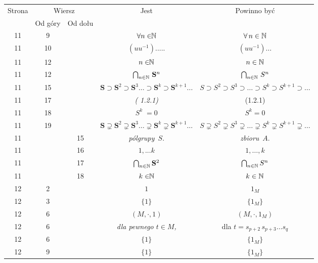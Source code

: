 \documentclass[a4paper,11pt]{article}
\begin{document}
\begin{center}
  \begin{tabular}{|c|c|c|c|c|}
    \hline
    Strona & \multicolumn{2}{c|}{Wiersz} & Jest
                              & Powinno być \\ \cline{2-3}
    & Od góry & Od dołu & & \\
    \hline
    11 &  9 & & $\forall n \in \!\! \mathbb{N}$ & $\forall \, n \in \mathbb{N}$ \\
    11 & 10 & & $( u u^{ -1 } ).....$ & $( u u^{ - 1 } ) \ldots$ \\
    11 & 12 & & $n \in \!\! \mathbb{N}$ & $n \in \mathbb{N}$ \\
    11 & 12 & & $\bigcap_{ n \in \mathbb{N} } \, \mathbf{S}^{ n }$
    & $\bigcap_{ n \in \mathbb{N} } \, S^{ n }$ \\
    11 & 15 & & $\mathbf{S} \supset \mathbf{S}^{ 2 } \supset \mathbf{S}^{ 3 } \ldots
                \supset \mathbf{S}^{ k } \supset \mathbf{S}^{ k + 1 } ...$
    & $S \supset S^{ 2 } \supset S^{ 3 } \supset \ldots \supset S^{ k } \supset S^{ k + 1 } \supset \ldots$ \\
    11 & 17 & & \textit{( 1.2.1)} & (1.2.1) \\
    11 & 18 & & $S^{ k } \; = 0$ & $S^{ k } = 0$ \\
    11 & 19 & & $\mathbf{S} \supsetneq \mathbf{S}^{ 2 } \supsetneq \mathbf{S}^{ 3 } \ldots
                \supsetneq \mathbf{S}^{ k } \supsetneq \mathbf{S}^{ k + 1 } \ldots$
                & $S \supsetneq S^{ 2 } \supsetneq S^{ 3 } \supsetneq \ldots \supsetneq S^{ k } \supsetneq S^{ k + 1 } \supsetneq \ldots$ \\
    11 & & 15 & \textit{pólgrupy}~$S$. & \textit{zbioru}~$A$. \\
    11 & & 16 & $1, ...k$ & $1, \ldots, k$ \\
    11 & & 17 & $\bigcap_{ n \in \mathbb{N} } \mathbf{S}^{ 2 }$
           & $\bigcap_{ n \in \mathbb{N} } S^{ n }$ \\
    11 & & 18 & $k \in \!\! \mathbb{N}$ & $k \in \mathbb{N}$ \\
    12 &  2 & & $1$ & $1_{ M }$ \\
    12 &  3 & & $\{ 1 \}$ & $\{ 1_{ M } \}$ \\
    12 &  6 & & $( M, \cdot, 1 )$ & $( M, \cdot, 1_{ M } )$ \\
    12 &  6 & & \textit{dla pewnego $t \in M$,}
    & dla $t = s_{ p + 2 } \, s_{ p + 3 } \ldots s_{ q }$ \\
    12 &  6 & & $\{ 1 \}$ & $\{ 1_{ M } \}$ \\
    12 &  9 & & $\{ 1 \}$ & $\{ 1_{ M } \}$ \\

\end{tabular}
\end{center}
\end{document}
